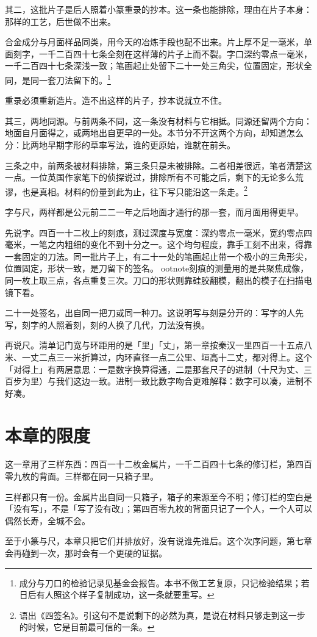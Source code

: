 其二，这批片子是后人照着小篆重录的抄本。这一条也能排除，理由在片子本身：那样的工艺，后世做不出来。

合金成分与月面样品同类，用今天的冶炼手段也配不出来。片上厚不足一毫米，单面刻字，一千二百四十七条全刻在这样薄的片子上而不裂。字口深约零点一毫米，一千二百四十七条深浅一致；笔画起止处留下二十一处三角尖，位置固定，形状全同，是同一套刀法留下的。\footnote{成分与刀口的检验记录见基金会报告。本书不做工艺复原，只记检验结果；若日后有人照这个样子复制成功，这一条就要重写。}

重录必须重新造片。造不出这样的片子，抄本说就立不住。

其三，两地同源。与前两条不同，这一条没有材料与它相抵。同源还留两个方向：地面自月面得之，或两地出自更早的一处。本节分不开这两个方向，却知道怎么分：比两地早期字形的草率写法，谁的更原始，谁就在前头。

三条之中，前两条被材料排除，第三条只是未被排除。二者相差很远，笔者清楚这一点。一位英国作家笔下的侦探说过，排除所有不可能之后，剩下的无论多么荒谬，也是真相。材料的份量到此为止，往下写只能沿这一条走。\footnote{语出《四签名》。引这句不是说剩下的必然为真，是说在材料只够走到这一步的时候，它是目前最可信的一条。}

字与尺，两样都是公元前二二一年之后地面才通行的那一套，而月面用得更早。

先说字。四百一十二枚上的刻痕，测过深度与宽度：深约零点一毫米，宽约零点四毫米，一笔之内粗细的变化不到十分之一。这个均匀程度，靠手工刻不出来，得靠一套固定的刀法。同一批片子上，有二十一处的笔画起止带一个极小的三角形尖，位置固定，形状一致，是刀留下的签名。ootnote{刻痕的测量用的是共聚焦成像，同一枚上取三点，各点重复三次。刀口的形状则靠硅胶翻模，翻出的模子在扫描电镜下看。}

二十一处签名，出自同一把刀或同一种刀。这说明写与刻是分开的：写字的人先写，刻字的人照着刻，刻的人换了几代，刀法没有换。

再说尺。清单记门宽与环距用的是「里」「丈」，第一章按秦汉一里四百一十五点八米、一丈二点三一米折算过，内环直径一点二公里、垣高十二丈，都对得上。这个「对得上」有两层意思：一是数字换算得通，二是那套尺子的进制（十尺为丈、三百步为里）与我们这边一致。进制一致比数字吻合更难解释：数字可以凑，进制不好凑。

\section{本章的限度}

这一章用了三样东西：四百一十二枚金属片，一千二百四十七条的修订栏，第四百零九枚的背面。三样都在同一只箱子里。

三样都只有一份。金属片出自同一只箱子，箱子的来源至今不明；修订栏的空白是「没有写」，不是「写了没有改」；第四百零九枚的背面只记了一个人，一个人可以偶然长寿，全城不会。

至于小篆与尺，本章只把它们并排放好，没有说谁先谁后。这个次序问题，第七章会再碰到一次，那时会有一个更硬的证据。
